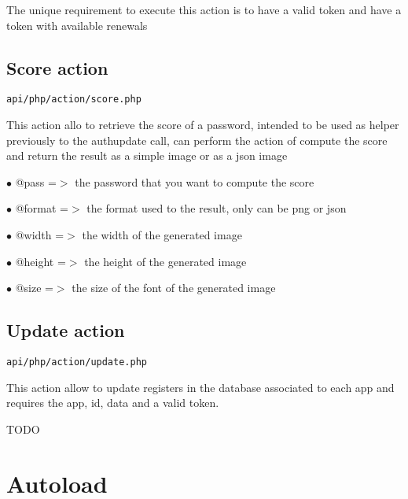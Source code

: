 \documentclass[a4paper]{book}
\begin{document}
The unique requirement to execute this action is to have a valid token
and have a token with available renewals

\hypertarget{toc18}{}
\section{Score action}

\begin{lstlisting}
api/php/action/score.php
\end{lstlisting}

This action allo to retrieve the score of a password, intended to be used
as helper previously to the authupdate call, can perform the action of
compute the score and return the result as a simple image or as a json
image

\begin{compactitem}
\item[\color{myblue}$\bullet$] @pass   =$>$ the password that you want to compute the score
\item[\color{myblue}$\bullet$] @format =$>$ the format used to the result, only can be png or json
\end{compactitem}

\begin{compactitem}
\item[\color{myblue}$\bullet$] @width  =$>$ the width of the generated image
\item[\color{myblue}$\bullet$] @height =$>$ the height of the generated image
\item[\color{myblue}$\bullet$] @size   =$>$ the size of the font of the generated image
\end{compactitem}

\hypertarget{toc19}{}
\section{Update action}

\begin{lstlisting}
api/php/action/update.php
\end{lstlisting}

This action allow to update registers in the database associated to
each app and requires the app, id, data and a valid token.

TODO


\hypertarget{toc20}{}
\chapter{Autoload}
\end{document}

